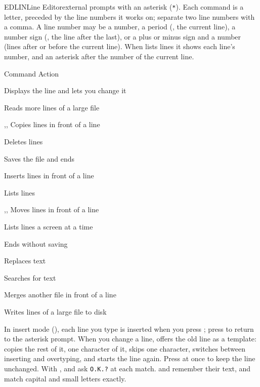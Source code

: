 \begin{DosEntry}{EDLIN}{Line Editor}{external}
 prompts with an asterisk (\texttt{*}).  Each command is a
letter, preceded by the line numbers it works on; separate two line
numbers with a comma.  A line number may be a number, a period (,
the current line), a number sign (\type{\#}, the line after the last), or a
plus or minus sign and a number (lines after or before the current line).
When  lists lines it shows each line's number, and an asterisk
after the number of the current line.
\par\medskip
\begin{list}{}{\leftmargin=56mm  
  \itemsep=1pt \parsep=0pt \topsep=2pt
  \renewcommand\makelabel[1]{\parbox[t]{54mm}{\RaggedRight #1}}}
\item[{\imSideHeadFont Command}] {\imSideHeadFont Action}
\item[\ph{line}] Displays the line and lets you change it
\item[\opt{\ph{n}}\kw{A}] Reads  more lines of a large file
\item[\ph{line},\ph{line},\ph{line}\opt{,\ph{count}}\kw{C}] Copies lines in front of a line
\item[\opt{\ph{line}}\opt{,\ph{line}}\kw{D}] Deletes lines
\item[\kw{E}] Saves the file and ends 
\item[\opt{\ph{line}}\kw{I}] Inserts lines in front of a line
\item[\opt{\ph{line}}\opt{,\ph{line}}\kw{L}] Lists lines
\item[\ph{line},\ph{line},\ph{line}\kw{M}] Moves lines in front of a line
\item[\opt{\ph{line}}\opt{,\ph{line}}\kw{P}] Lists lines a screen at a time
\item[\kw{Q}] Ends  without saving
\item[\opt{\ph{line}}\opt{,\ph{line}}\opt{\kw{?}}\kw{R}\ph{old}\key{Ctrl-Z}\ph{new}] Replaces text
\item[\opt{\ph{line}}\opt{,\ph{line}}\opt{\kw{?}}\kw{S}\ph{text}] Searches for text
\item[\opt{\ph{line}}\kw{T}\ph{filename}] Merges another file in front of a line
\item[\opt{\ph{n}}\kw{W}] Writes  lines of a large file to disk
\end{list}
\par\medskip
In insert mode (), each line you type is inserted when you press
; press  to return to the asterisk prompt.  When you
change a line,  offers the old line as a template: 
copies the rest of it,  one character of it,  skips one
character,  switches between inserting and overtyping, and
 starts the line again.  Press  at once to keep the line
unchanged.  With ,  and  ask \texttt{O.K.?} at each match.
 and  remember their text, and match capital and small letters
exactly.


\end{DosEntry}
